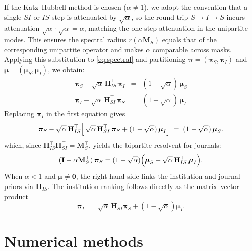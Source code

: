 If the Katz--Hubbell method is chosen ($\alpha \ne 1$), we adopt the convention that a single $SI$ or $IS$ step is attenuated by $\sqrt{\alpha}$, so the round-trip $S\to I\to S$ incurs attenuation $\sqrt{\alpha}\cdot\sqrt{\alpha}=\alpha$, matching the one-step attenuation in the unipartite modes. This ensures the spectral radius $r(\alpha\mathbf{M}_S)$ equals that of the corresponding unipartite operator and makes $\alpha$ comparable across masks.
Applying this substitution to \eqref{eq:spectral} and partitioning $\boldsymbol{\pi} = (\boldsymbol{\pi}_S, \boldsymbol{\pi}_I)$
and $\boldsymbol{\mu} = (\boldsymbol{\mu}_S, \boldsymbol{\mu}_I)$, we obtain:\begin{eqnarray*}
	\boldsymbol{\pi}_S - \sqrt{\alpha}\,\mathbf{H}_{IS}^{\top}\,\boldsymbol{\pi}_I & = & (1-\sqrt{\alpha})\,\boldsymbol{\mu}_S \\
	\boldsymbol{\pi}_I - \sqrt{\alpha}\,\mathbf{H}_{SI}^{\top}\,\boldsymbol{\pi}_S & = & (1-\sqrt{\alpha})\,\boldsymbol{\mu}_I
\end{eqnarray*}
Replacing $\boldsymbol{\pi}_I$ in the first equation gives
\[
\boldsymbol{\pi}_S - \sqrt{\alpha}\,\mathbf{H}_{IS}^{\top}\Bigl[\,\sqrt{\alpha}\,\mathbf{H}_{SI}^{\top}\,\boldsymbol{\pi}_S + (1-\sqrt{\alpha})\,\boldsymbol{\mu}_I\Bigr] \;=\; (1-\sqrt{\alpha})\,\boldsymbol{\mu}_S .
\]
\noindent which, since
\(\mathbf{H}_{IS}^{\top}\mathbf{H}_{SI}^{\top}  = \mathbf{M}_S^{\top}\),  yields the bipartite resolvent for journals:
\[
(\mathbf{I} - \alpha \mathbf{M}_S^{\top})\,\boldsymbol{\pi}_S = (1-\sqrt{\alpha})\Bigl(\boldsymbol{\mu}_S + \sqrt{\alpha}\,\mathbf{H}_{IS}^{\top}\,\boldsymbol{\mu}_I\Bigr) .
\]
When $\alpha<1$ and $\boldsymbol{\mu}\ne\mathbf{0}$, the right-hand side links the institution and journal priors via $\mathbf{H}_{IS}^\top$. The institution ranking follows directly as the matrix--vector product
\begin{equation}
  \boldsymbol{\pi}_I
  \;=\;
  \sqrt{\alpha}\,\mathbf{H}_{SI}^\top\boldsymbol{\pi}_S+(1-\sqrt{\alpha})\boldsymbol{\mu}_I.
  \label{eq:kh_inst}
\end{equation}

\section{Numerical methods}
\label{sec:numerics}

